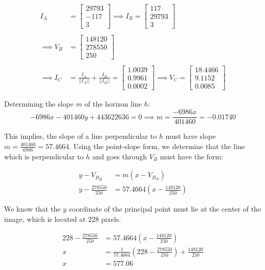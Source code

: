 \documentclass[12pt, oneside]{article}
\begin{document}
\begin{align*}
I_A &= \begin{bmatrix} 29793 \\ -117 \\ 3 \end{bmatrix}  \implies 
I_B = \begin{bmatrix} 117 \\ 29793 \\ 3 \end{bmatrix}  \\ \\
\implies  V_B &= \begin{bmatrix} 148120 \\ 278550 \\ 250 \end{bmatrix} \\ \\ 
\implies  I_C &= \frac{I_A}{||I_A||}  + \frac{I_B}{||I_B||} = 
\begin{bmatrix} 1.0039 \\ 0.9961 \\ 0.0002 \end{bmatrix}  \implies
V_C = 
\begin{bmatrix} 18.4466 \\ 9.1152 \\ 0.0085 \end{bmatrix} 
\end{align*}

Determining the slope $m$ of the horizon line $h$: 
$$ -6986x -401460 y +  443622636 = 0  \implies m = \frac{-6986x}{401460} = -0.01740$$

This implies, the slope of a line perpendicular to $h$ must have slope $m = 
\frac{401460}{6986} = 57.4664$. Using the point-slope form, we determine that the line 
which is perpendicular to $h$ and goes through $V_B$ must have the form:

\begin{align*}
    y - {V_B}_y &= m (x - {V_B}_x)  \\
    y - \frac{278550}{250} &= 57.4664 (x - \frac{148120}{250}) 
\end{align*}

We know that the $y$ coordinate of the principal point must lie at the center 
of the image, which is located at $228$ pixels.

\begin{align*}
    228 - \frac{278550}{250} &= 57.4664 (x - \frac{148120}{250})  \\
    x &=  \frac{1}{ 57.4664}( 228 -  \frac{278550}{250}) + \frac{148120}{250}  \\
    x &=  577.06 \\
\end{align*}
\end{document}
